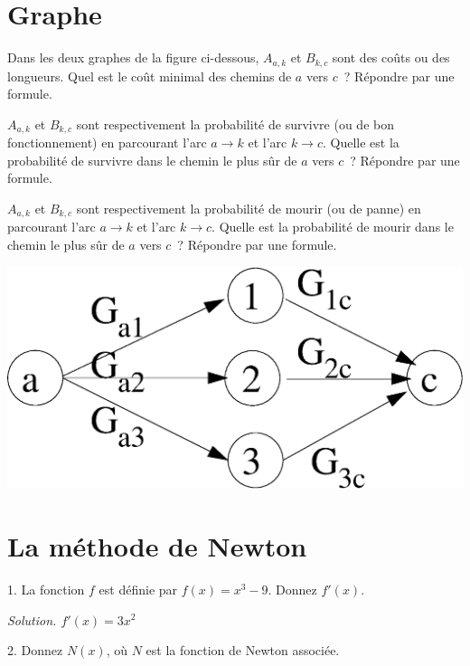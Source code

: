 \documentclass[11pt]{article}
\begin{document}
\section{Graphe}
Dans les deux graphes de la figure ci-dessous, $A_{a,k}$ et $B_{k,c}$ sont des coûts ou des longueurs. Quel est le coût minimal des chemins de $a$ vers $c$~? Répondre par une formule.

\else\fi

$A_{a,k}$ et $B_{k,c}$ sont respectivement  la probabilité de survivre
(ou de bon fonctionnement) en parcourant l'arc
$a\rightarrow k$ et l'arc $k\rightarrow c$. Quelle est la probabilité de survivre dans le chemin le plus sûr  de $a$ vers $c$~? Répondre par une formule.

\else\fi

$A_{a,k}$ et $B_{k,c}$ sont respectivement  la probabilité de mourir (ou de panne) en parcourant l'arc
$a\rightarrow k$ et l'arc $k\rightarrow c$. Quelle est la probabilité de mourir dans le chemin le plus sûr  de $a$ vers $c$~? Répondre par une formule.

\else\fi

\begin{center}
\includegraphics[width=0.5\linewidth]{graphe.eps}
\end{center}



\section{La méthode de Newton}

1. La fonction $f$ est définie par $f(x)=x^3-9$. Donnez $f'(x)$.

\ifcorrige
{\it Solution. $f'(x)=3x^2$ }
\else\fi

2. Donnez  $N(x)$, où $N$ est la fonction de Newton associée.
\end{document}
